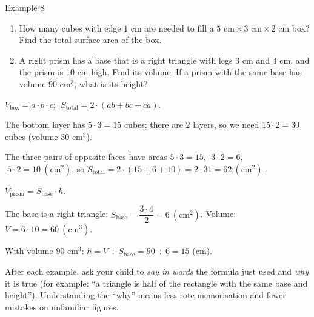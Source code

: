 \begin{exbox}{Example 8}
\begin{enumerate}[label=\alph*),leftmargin=1.6em,itemsep=0pt,topsep=2pt]
  \item How many cubes with edge $1$ cm are needed to fill a $5\text{ cm}\times3\text{ cm}\times2\text{ cm}$ box? Find the total surface area of the box.
  \item A right prism has a base that is a right triangle with legs $3$ cm and $4$ cm, and the prism is $10$ cm high. Find its volume. If a prism with the same base has volume $90\text{ cm}^3$, what is its height?
\end{enumerate}
\guide
{}
\begin{recallbox}$V_{\text{box}}=a\cdot b\cdot c$; $\;S_{\text{total}}=2\cdot(ab+bc+ca)$.\end{recallbox}
The bottom layer has $5\cdot3=15$ cubes; there are $2$ layers, so we need $15\cdot2=30$ cubes (volume $30\text{ cm}^3$).

The three pairs of opposite faces have areas $5\cdot3=15$, $\;3\cdot2=6$, $\;5\cdot2=10\ (\text{cm}^2)$, so
$S_{\text{total}}=2\cdot(15+6+10)=2\cdot31=62\ (\text{cm}^2)$.

\begin{recallbox}$V_{\text{prism}}=S_{\text{base}}\cdot h$.\end{recallbox}
The base is a right triangle: $S_{\text{base}}=\dfrac{3\cdot4}{2}=6\ (\text{cm}^2)$. Volume: $V=6\cdot10=60\ (\text{cm}^3)$.

With volume $90\text{ cm}^3$: $h=V\div S_{\text{base}}=90\div6=15$ (cm).
\end{exbox}

\begin{parentbox}
After each example, ask your child to \emph{say in words} the formula just used and \emph{why} it is true (for example: ``a triangle is half of the rectangle with the same base and height''). Understanding the ``why'' means less rote memorisation and fewer mistakes on unfamiliar figures.
\end{parentbox}

\clearpage
{}

